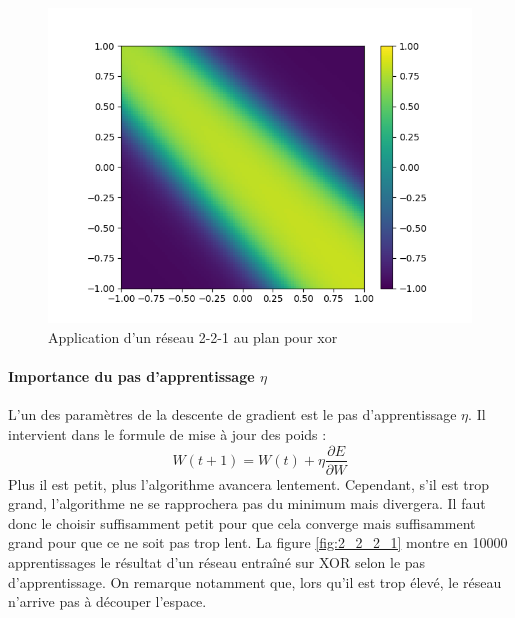 \begin{figure}[ht!]
  \includegraphics[width=\linewidth]{fig/xor221_eta009.png}
  \caption{Application d'un réseau 2-2-1 au plan pour xor}
  \label{fig:2_2_1}
\end{figure}



\paragraph{Importance du pas d'apprentissage $\eta$}

L'un des paramètres de la descente de gradient est le pas d'apprentissage $\eta$. Il intervient dans le formule de mise à jour des poids :
\[
W(t+1) = W(t) + \eta \frac{\partial E}{\partial W} 
\]
Plus il est petit, plus l'algorithme avancera lentement. Cependant, s'il est trop grand, l'algorithme ne se rapprochera pas du minimum mais divergera. Il faut donc le choisir suffisamment petit pour que cela converge mais suffisamment grand pour que ce ne soit pas trop lent. La figure \ref{fig:2_2_2_1} montre en 10000 apprentissages le résultat d'un réseau entraîné sur XOR selon le pas d'apprentissage. On remarque notamment que, lors qu'il est trop élevé, le réseau n'arrive pas à découper l'espace.

